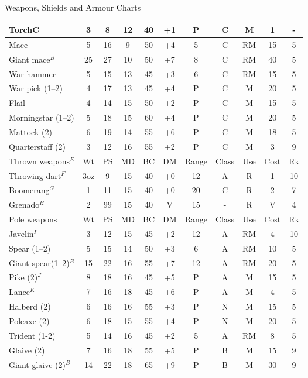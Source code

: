 \begin{Tables}{Weapons, Shields and Armour Charts}
\begin{tabularx}{\linewidth}{Xcccccccccc}
TorchC			& 3	& 8	& 12	& 40	& +1	& P	& C	& M	& 1	& -	\\ \hline
Mace			& 5	& 16	& 9	& 50	& +4	& 5	& C	& RM	& 15	& 5	\\ \hline
Giant mace$^B$		& 25	& 27	& 10	& 50	& +7	& 8	& C	& RM	& 40	& 5	\\ \hline
War hammer		& 5	& 15	& 13	& 45	& +3	& 6	& C	& RM	& 15	& 5	\\ \hline
War pick (1--2)		& 4	& 17	& 13	& 45	& +4	& P	& C	& M	& 20	& 5	\\ \hline
Flail			& 4	& 14	& 15	& 50	& +2	& P	& C	& M	& 15	& 5	\\ \hline
Morningstar (1--2)	& 5	& 18	& 15	& 60	& +4	& P	& C	& M	& 20	& 5	\\ \hline
Mattock (2)		& 6	& 19	& 14	& 55	& +6	& P	& C	& M	& 18	& 5	\\ \hline
Quarterstaff (2)	& 3	& 12	& 16	& 55	& +2	& P	& C	& M	& 3	& 9	\\ \midrule
\rowcolor{BurntOrange}
Thrown weapons$^E$		& Wt	& PS	& MD	& BC	& DM	& Range	& Class	& Use	& Cost	& Rk	\\ \midrule
Throwing dart$^F$	& 3oz	& 9	& 15	& 40	& +0	& 12	& A	& R	& 1	& 10	\\ \hline
Boomerang$^G$		& 1	& 11	& 15	& 40	& +0	& 20	& C	& R	& 2	& 7	\\ \hline
Grenado$^H$		& 2	& 99	& 15	& 40	& V	& 15	& -	& R	& V	& 4	\\ \midrule
\rowcolor{BurntOrange}
Pole weapons		& Wt	& PS	& MD	& BC	& DM	& Range	& Class	& Use	& Cost	& Rk	\\ \midrule
Javelin$^I$		& 3	& 12	& 15	& 45	& +2	& 12	& A	& RM	& 4	& 10	\\ \hline
Spear (1--2)		& 5	& 15	& 14	& 50	& +3	& 6	& A	& RM	& 10	& 5	\\ \hline
Giant spear(1--2)$^B$	& 15	& 22	& 16	& 55	& +7	& 12	& A	& RM	& 20	& 5	\\ \hline
Pike (2)$^J$		& 8	& 18	& 16	& 45	& +5	& P	& A	& M	& 15	& 5	\\ \hline
Lance$^K$		& 7	& 16	& 18	& 45	& +6	& P	& A	& M	& 4	& 5	\\ \hline
Halberd (2)		& 6	& 16	& 16	& 55	& +3	& P	& N	& M	& 15	& 5	\\ \hline
Poleaxe (2)		& 6	& 18	& 15	& 55	& +4	& P	& N	& M	& 20	& 5	\\ \hline
Trident (1-2)		& 5	& 14	& 16	& 45	& +2	& 5	& A	& RM	& 8	& 5	\\ \hline
Glaive (2)		& 7	& 16	& 18	& 55	& +5	& P	& B	& M	& 15	& 9	\\ \hline
Giant glaive (2)$^B$	& 14	& 22	& 18	& 65	& +9	& P	& B	& M	& 30	& 9	\\ \midrule

\end{tabularx}
\end{Tables}
